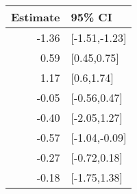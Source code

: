 \begin{tabular}{rl}
  \hline
Estimate & 95\% CI \\ 
  \hline
-1.36 & [-1.51,-1.23] \\ 
  0.59 & [0.45,0.75] \\ 
  1.17 & [0.6,1.74] \\ 
  -0.05 & [-0.56,0.47] \\ 
  -0.40 & [-2.05,1.27] \\ 
  -0.57 & [-1.04,-0.09] \\ 
  -0.27 & [-0.72,0.18] \\ 
  -0.18 & [-1.75,1.38] \\ 
   \hline
\end{tabular}

